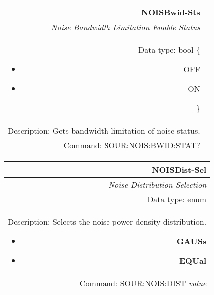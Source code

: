 \documentclass[openany]{article}
\begin{document}
		\begin{tabular}{N}
			\hline
			\bfseries NOISBwid-Sts \\ \hline
			\emph{Noise Bandwidth Limitation Enable Status} \\
			Data type: bool \{\begin{itemize}[noitemsep]
				\small
				\item[] OFF
				\item[] ON
			\end{itemize}\} \\
			Description: Gets bandwidth limitation of noise status. \\
			Command: SOUR:NOIS:BWID:STAT? \\
			
		\end{tabular}
%
		\begin{tabular}{N}
			\hline
			\bfseries NOISDist-Sel \\ \hline
			\emph{Noise Distribution Selection} \\
			Data type: enum \\   
			Description: Selects the noise power density distribution.\begin{itemize}[noitemsep]
				\small
				\item[] \textbf{GAUSs}
                                \item[] \textbf{EQUal}

			\end{itemize} \\
			Command: SOUR:NOIS:DIST \emph{value} \\

		\end{tabular}
\end{document}
